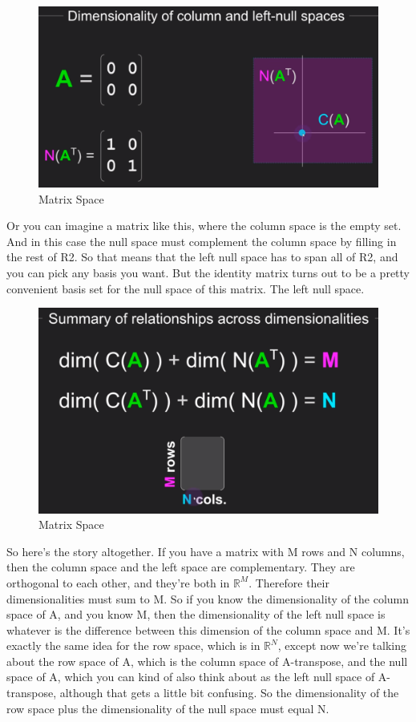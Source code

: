 \documentclass[fleqn,10pt]{olplainarticle}
\theoremstyle{definition}
\theoremstyle{remark}
\begin{document}
\begin{figure}[ht]
	\centering
	\includegraphics[width=0.6\linewidth]{images/matrix-space-34.png}
	\caption{Matrix Space}
	\label{fig:matrix_space_34}
\end{figure}

Or you can imagine a matrix like this, where the column space is the empty set. And in this case the null space must complement the column space by filling in the rest of R2. So that means that the left null space has to span all of R2, and you can pick any basis you want. But the identity matrix turns out to be a pretty convenient basis set for the null space of this matrix. The left null space.

\begin{figure}[ht]
	\centering
	\includegraphics[width=0.6\linewidth]{images/matrix-space-35.png}
	\caption{Matrix Space}
	\label{fig:matrix_space_35}
\end{figure}

So here's the story altogether. If you have a matrix with M rows and N columns, then the column space and the left space are complementary. They are orthogonal to each other, and they're both in $\mathbb{R}^M$. Therefore their dimensionalities must sum to M. So if you know the dimensionality of the column space of A, and you know M, then the dimensionality of the left null space is whatever is the difference between this dimension of the column space and M. It's exactly the same idea for the row space, which is in $\mathbb{R}^N$, except now we're talking about the row space of A, which is the column space of A-transpose, and the null space of A, which you can kind of also think about as the left null space of A-transpose, although that gets a little bit confusing. So the dimensionality of the row space plus the dimensionality of the null space must equal N. 
\end{document}

